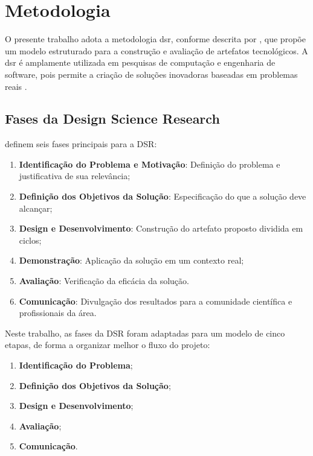 \chapter{Metodologia}
\label{cap:metodologia}

O presente trabalho adota a metodologia \gls{dsr}, conforme descrita por \cite{peffers2007design}, que propõe um modelo estruturado para a construção e avaliação de artefatos tecnológicos. A \gls{dsr} é amplamente utilizada em pesquisas de computação e engenharia de software, pois permite a criação de soluções inovadoras baseadas em problemas reais \citep{horita2019design}.

\section{Fases da Design Science Research}

\cite{peffers2007design} definem seis fases principais para a DSR:

\begin{enumerate}
    \item \textbf{Identificação do Problema e Motivação}: Definição do problema e justificativa de sua relevância;
    \item \textbf{Definição dos Objetivos da Solução}: Especificação do que a solução deve alcançar;
    \item \textbf{Design e Desenvolvimento}: Construção do artefato proposto dividida em ciclos;
    \item \textbf{Demonstração}: Aplicação da solução em um contexto real;
    \item \textbf{Avaliação}: Verificação da eficácia da solução.
    \item \textbf{Comunicação}: Divulgação dos resultados para a comunidade científica e profissionais da área.
\end{enumerate}

Neste trabalho, as fases da DSR foram adaptadas para um modelo de cinco etapas, de forma a organizar melhor o fluxo do projeto:

\begin{enumerate}
    \item \textbf{Identificação do Problema};
    \item \textbf{Definição dos Objetivos da Solução};
    \item \textbf{Design e Desenvolvimento};
    \item \textbf{Avaliação};
    \item \textbf{Comunicação}.
\end{enumerate}

